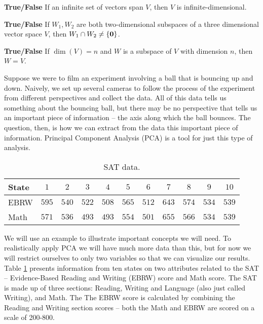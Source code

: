 \item \textbf{True/False} If an infinite set of vectors span $V$, then $V$ is infinite-dimensional.

\item \textbf{True/False} If $W_1, W_2$ are both two-dimensional subspaces of a three dimensional vector space $V$, then $W_1\cap W_2\neq \{\mathbf{0} \}$.

\item \textbf{True/False} If $\dim(V)=n$ and $W$ is a subspace of $V$ with dimension $n$, then $W=V$.




\ea

\ee



Suppose we were to film an experiment involving a ball that is bouncing up and down. Naively, we set up several cameras to follow the process of the experiment from different perspectives and collect the data. All of this data tells us something about the bouncing ball, but there may be no perspective that tells us an important piece of information -- the axis along which the ball bounces. The question, then, is how we can extract from the data this important piece of information. Principal Component Analysis (PCA) is a tool for just this type of analysis. 


\begin{table}[ht]
\begin{center}
\begin{tabular}{lcccccccccc} 
State			&$1$	 &$2$ &$3$ &$4$ &$5$ &$6$ &$7$ &$8$ &$9$ &$10$ \\ \hline
EBRW		&$595$ &$540$ &$522$ &$508$ &$565$ &$512$ &$643$ &$574$ &$534$ &$539$ \\
Math			&$571$ &$536$ &$493$ &$493$ &$554$ &$501$ &$655$ &$566$ &$534$ &$539$ 
\end{tabular}
\caption{SAT data.}
\label{T:PCA_SAT_2}
\end{center}
\end{table}
We will use an example to illustrate important concepts we will need. To realistically apply PCA we will have much more data than this, but for now we will restrict ourselves to only two variables so that we can visualize our results. Table \ref{T:PCA_SAT_2} presents information from ten states on two attributes related to the SAT -- Evidence-Based Reading and Writing (EBRW) score and Math score. The SAT is made up of three sections: Reading, Writing and Language (also just called Writing), and Math. The The EBRW score is calculated by combining the Reading and Writing section scores -- both the Math and EBRW are scored on a scale of 200-800.

